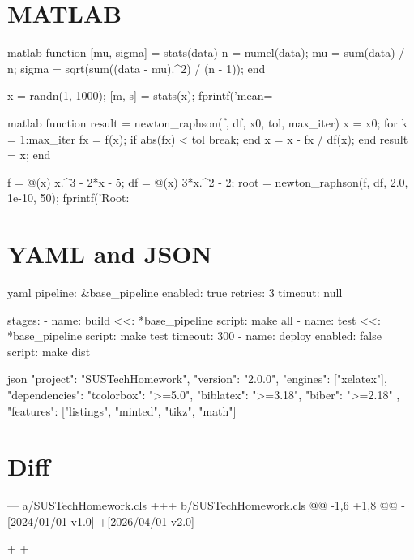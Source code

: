 \documentclass[code=listings]{SUSTechHomework}
\begin{document}
\section{MATLAB}

\begin{sustechcode}{matlab}
function [mu, sigma] = stats(data)
    n     = numel(data);
    mu    = sum(data) / n;
    sigma = sqrt(sum((data - mu).^2) / (n - 1));
end

x = randn(1, 1000);
[m, s] = stats(x);
fprintf('mean=%
\end{sustechcode}

\begin{sustechcode}{matlab}
function result = newton_raphson(f, df, x0, tol, max_iter)
    x = x0;
    for k = 1:max_iter
        fx = f(x);
        if abs(fx) < tol
            break;
        end
        x = x - fx / df(x);
    end
    result = x;
end

f  = @(x) x.^3 - 2*x - 5;
df = @(x) 3*x.^2 - 2;
root = newton_raphson(f, df, 2.0, 1e-10, 50);
fprintf('Root: %
\end{sustechcode}

\section{YAML and JSON}

\begin{sustechcode}{yaml}
pipeline: &base_pipeline
  enabled: true
  retries: 3
  timeout: null

stages:
  - name: build
    <<: *base_pipeline
    script: make all
  - name: test
    <<: *base_pipeline
    script: make test
    timeout: 300
  - name: deploy
    enabled: false
    script: make dist
\end{sustechcode}

\begin{sustechcode}{json}
{
  "project": "SUSTechHomework",
  "version": "2.0.0",
  "engines": ["xelatex"],
  "dependencies": {
    "tcolorbox": ">=5.0",
    "biblatex":  ">=3.18",
    "biber":     ">=2.18"
  },
  "features": ["listings", "minted", "tikz", "math"]
}
\end{sustechcode}

\section{Diff}

\begin{sustechdiff}
--- a/SUSTechHomework.cls
+++ b/SUSTechHomework.cls
@@ -1,6 +1,8 @@
-[2024/01/01 v1.0]
+[2026/04/01 v2.0]
 
+\RequirePackage{kvoptions}
+\RequirePackage{etoolbox}
\end{sustechdiff}
\end{document}
